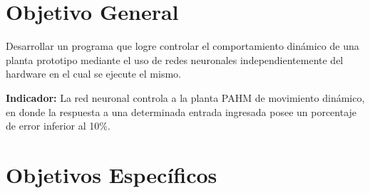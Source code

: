 \documentclass[12pt]{article}
\begin{document}
\section{Objetivo General}

Desarrollar un programa que logre controlar el comportamiento dinámico de una planta prototipo mediante el uso de redes neuronales independientemente del hardware en el cual se ejecute el mismo.

\textbf{Indicador:} La red neuronal controla a la planta PAHM de movimiento dinámico, en donde la respuesta a una determinada entrada ingresada posee un porcentaje de error inferior al 10\%.

\section{Objetivos Específicos}
\end{document}
